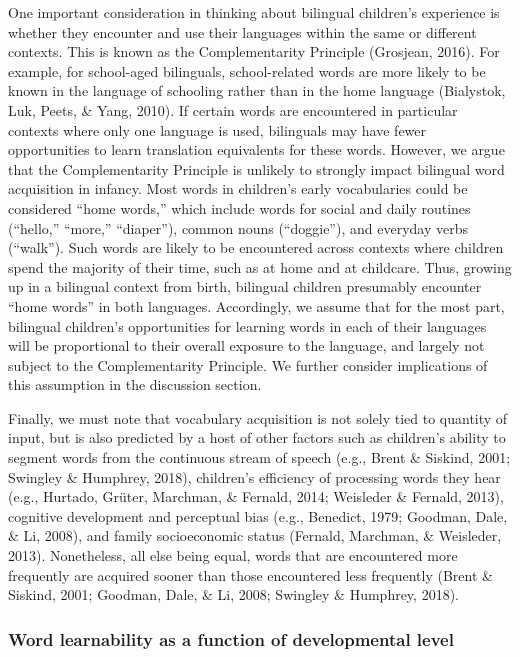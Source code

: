 \documentclass[
  english,
  ,man,floatsintext]{apa6}
\begin{document}
One important consideration in thinking about bilingual children's experience is whether they encounter and use their languages within the same or different contexts. This is known as the Complementarity Principle (Grosjean, 2016). For example, for school-aged bilinguals, school-related words are more likely to be known in the language of schooling rather than in the home language (Bialystok, Luk, Peets, \& Yang, 2010). If certain words are encountered in particular contexts where only one language is used, bilinguals may have fewer opportunities to learn translation equivalents for these words. However, we argue that the Complementarity Principle is unlikely to strongly impact bilingual word acquisition in infancy. Most words in children's early vocabularies could be considered ``home words,'' which include words for social and daily routines (``hello,'' ``more,'' ``diaper''), common nouns (``doggie''), and everyday verbs (``walk''). Such words are likely to be encountered across contexts where children spend the majority of their time, such as at home and at childcare. Thus, growing up in a bilingual context from birth, bilingual children presumably encounter ``home words'' in both languages. Accordingly, we assume that for the most part, bilingual children's opportunities for learning words in each of their languages will be proportional to their overall exposure to the language, and largely not subject to the Complementarity Principle. We further consider implications of this assumption in the discussion section.

Finally, we must note that vocabulary acquisition is not solely tied to quantity of input, but is also predicted by a host of other factors such as children's ability to segment words from the continuous stream of speech (e.g., Brent \& Siskind, 2001; Swingley \& Humphrey, 2018), children's efficiency of processing words they hear (e.g., Hurtado, Grüter, Marchman, \& Fernald, 2014; Weisleder \& Fernald, 2013), cognitive development and perceptual bias (e.g., Benedict, 1979; Goodman, Dale, \& Li, 2008), and family socioeconomic status (Fernald, Marchman, \& Weisleder, 2013). Nonetheless, all else being equal, words that are encountered more frequently are acquired sooner than those encountered less frequently (Brent \& Siskind, 2001; Goodman, Dale, \& Li, 2008; Swingley \& Humphrey, 2018).

\hypertarget{word-learnability-as-a-function-of-developmental-level}{%
\subsubsection{Word learnability as a function of developmental level}\label{word-learnability-as-a-function-of-developmental-level}}
\end{document}
